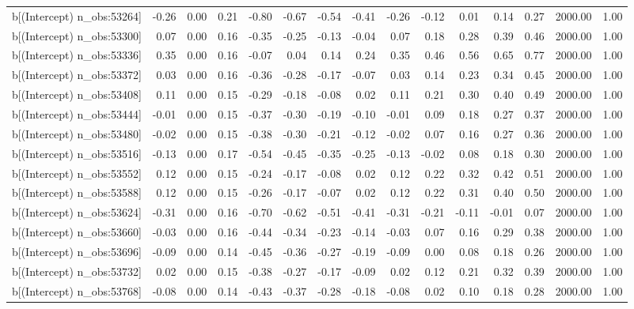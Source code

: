 \begin{table}[ht]
\begin{tabular}{rrrrrrrrrrrrrrr}
  b[(Intercept) n\_obs:53264] & -0.26 & 0.00 & 0.21 & -0.80 & -0.67 & -0.54 & -0.41 & -0.26 & -0.12 & 0.01 & 0.14 & 0.27 & 2000.00 & 1.00 \\ 
  b[(Intercept) n\_obs:53300] & 0.07 & 0.00 & 0.16 & -0.35 & -0.25 & -0.13 & -0.04 & 0.07 & 0.18 & 0.28 & 0.39 & 0.46 & 2000.00 & 1.00 \\ 
  b[(Intercept) n\_obs:53336] & 0.35 & 0.00 & 0.16 & -0.07 & 0.04 & 0.14 & 0.24 & 0.35 & 0.46 & 0.56 & 0.65 & 0.77 & 2000.00 & 1.00 \\ 
  b[(Intercept) n\_obs:53372] & 0.03 & 0.00 & 0.16 & -0.36 & -0.28 & -0.17 & -0.07 & 0.03 & 0.14 & 0.23 & 0.34 & 0.45 & 2000.00 & 1.00 \\ 
  b[(Intercept) n\_obs:53408] & 0.11 & 0.00 & 0.15 & -0.29 & -0.18 & -0.08 & 0.02 & 0.11 & 0.21 & 0.30 & 0.40 & 0.49 & 2000.00 & 1.00 \\ 
  b[(Intercept) n\_obs:53444] & -0.01 & 0.00 & 0.15 & -0.37 & -0.30 & -0.19 & -0.10 & -0.01 & 0.09 & 0.18 & 0.27 & 0.37 & 2000.00 & 1.00 \\ 
  b[(Intercept) n\_obs:53480] & -0.02 & 0.00 & 0.15 & -0.38 & -0.30 & -0.21 & -0.12 & -0.02 & 0.07 & 0.16 & 0.27 & 0.36 & 2000.00 & 1.00 \\ 
  b[(Intercept) n\_obs:53516] & -0.13 & 0.00 & 0.17 & -0.54 & -0.45 & -0.35 & -0.25 & -0.13 & -0.02 & 0.08 & 0.18 & 0.30 & 2000.00 & 1.00 \\ 
  b[(Intercept) n\_obs:53552] & 0.12 & 0.00 & 0.15 & -0.24 & -0.17 & -0.08 & 0.02 & 0.12 & 0.22 & 0.32 & 0.42 & 0.51 & 2000.00 & 1.00 \\ 
  b[(Intercept) n\_obs:53588] & 0.12 & 0.00 & 0.15 & -0.26 & -0.17 & -0.07 & 0.02 & 0.12 & 0.22 & 0.31 & 0.40 & 0.50 & 2000.00 & 1.00 \\ 
  b[(Intercept) n\_obs:53624] & -0.31 & 0.00 & 0.16 & -0.70 & -0.62 & -0.51 & -0.41 & -0.31 & -0.21 & -0.11 & -0.01 & 0.07 & 2000.00 & 1.00 \\ 
  b[(Intercept) n\_obs:53660] & -0.03 & 0.00 & 0.16 & -0.44 & -0.34 & -0.23 & -0.14 & -0.03 & 0.07 & 0.16 & 0.29 & 0.38 & 2000.00 & 1.00 \\ 
  b[(Intercept) n\_obs:53696] & -0.09 & 0.00 & 0.14 & -0.45 & -0.36 & -0.27 & -0.19 & -0.09 & 0.00 & 0.08 & 0.18 & 0.26 & 2000.00 & 1.00 \\ 
  b[(Intercept) n\_obs:53732] & 0.02 & 0.00 & 0.15 & -0.38 & -0.27 & -0.17 & -0.09 & 0.02 & 0.12 & 0.21 & 0.32 & 0.39 & 2000.00 & 1.00 \\ 
  b[(Intercept) n\_obs:53768] & -0.08 & 0.00 & 0.14 & -0.43 & -0.37 & -0.28 & -0.18 & -0.08 & 0.02 & 0.10 & 0.18 & 0.28 & 2000.00 & 1.00 \\ 

\end{tabular}
\end{table}
